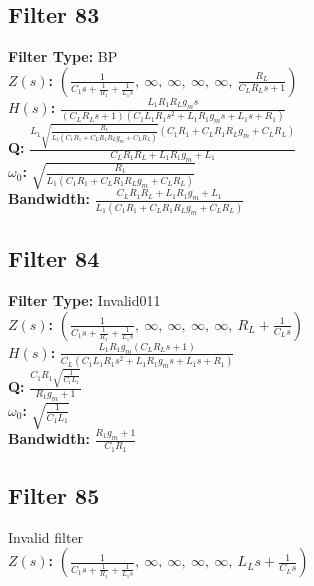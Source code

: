 \documentclass{article}
\begin{document}
\subsection*{Filter 83}
\textbf{Filter Type:} BP \\ 
\textbf{$Z(s)$:} $\left( \frac{1}{C_{1} s + \frac{1}{R_{1}} + \frac{1}{L_{1} s}}, \  \infty, \  \infty, \  \infty, \  \infty, \  \frac{R_{L}}{C_{L} R_{L} s + 1}\right)$ \\ 
\textbf{$H(s)$:} $\frac{L_{1} R_{1} R_{L} g_{m} s}{\left(C_{L} R_{L} s + 1\right) \left(C_{1} L_{1} R_{1} s^{2} + L_{1} R_{1} g_{m} s + L_{1} s + R_{1}\right)}$ \\ 
\textbf{Q:} $\frac{L_{1} \sqrt{\frac{R_{1}}{L_{1} \left(C_{1} R_{1} + C_{L} R_{1} R_{L} g_{m} + C_{L} R_{L}\right)}} \left(C_{1} R_{1} + C_{L} R_{1} R_{L} g_{m} + C_{L} R_{L}\right)}{C_{L} R_{1} R_{L} + L_{1} R_{1} g_{m} + L_{1}}$ \\ 
\textbf{$\omega_0$:} $\sqrt{\frac{R_{1}}{L_{1} \left(C_{1} R_{1} + C_{L} R_{1} R_{L} g_{m} + C_{L} R_{L}\right)}}$ \\ 
\textbf{Bandwidth:} $\frac{C_{L} R_{1} R_{L} + L_{1} R_{1} g_{m} + L_{1}}{L_{1} \left(C_{1} R_{1} + C_{L} R_{1} R_{L} g_{m} + C_{L} R_{L}\right)}$ \\ 
\subsection*{Filter 84}
\textbf{Filter Type:} Invalid011 \\ 
\textbf{$Z(s)$:} $\left( \frac{1}{C_{1} s + \frac{1}{R_{1}} + \frac{1}{L_{1} s}}, \  \infty, \  \infty, \  \infty, \  \infty, \  R_{L} + \frac{1}{C_{L} s}\right)$ \\ 
\textbf{$H(s)$:} $\frac{L_{1} R_{1} g_{m} \left(C_{L} R_{L} s + 1\right)}{C_{L} \left(C_{1} L_{1} R_{1} s^{2} + L_{1} R_{1} g_{m} s + L_{1} s + R_{1}\right)}$ \\ 
\textbf{Q:} $\frac{C_{1} R_{1} \sqrt{\frac{1}{C_{1} L_{1}}}}{R_{1} g_{m} + 1}$ \\ 
\textbf{$\omega_0$:} $\sqrt{\frac{1}{C_{1} L_{1}}}$ \\ 
\textbf{Bandwidth:} $\frac{R_{1} g_{m} + 1}{C_{1} R_{1}}$ \\ 
\subsection*{Filter 85}
Invalid filter \\ 
\textbf{$Z(s)$:} $\left( \frac{1}{C_{1} s + \frac{1}{R_{1}} + \frac{1}{L_{1} s}}, \  \infty, \  \infty, \  \infty, \  \infty, \  L_{L} s + \frac{1}{C_{L} s}\right)$ \\ 
\end{document}
